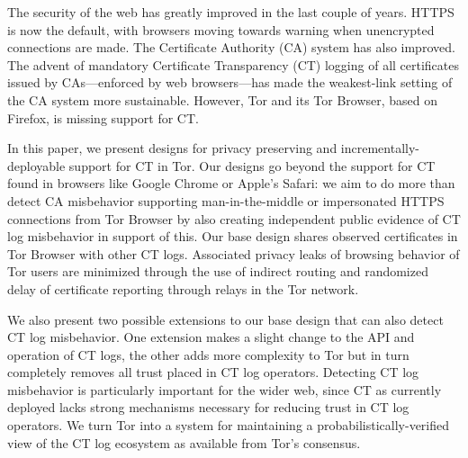 The security of the web has greatly improved in the last couple of years. HTTPS
is now the default, with browsers moving towards warning when unencrypted
connections are made. The Certificate Authority (CA) system has also improved.
The advent of mandatory Certificate Transparency (CT) logging of all
certificates issued by CAs---enforced by web browsers---has made the
weakest-link setting of the CA system more sustainable. However, Tor and its Tor
Browser, based on Firefox, is missing support for CT.

In this paper, we present designs for privacy preserving and
incrementally-deployable support for CT in Tor. Our designs go beyond
the support for CT found in browsers like Google Chrome or Apple's
Safari: we aim to do more than detect CA misbehavior supporting
man-in-the-middle or impersonated HTTPS connections from Tor Browser
by also creating independent public evidence of CT log misbehavior in
support of this. Our base design shares observed certificates in Tor
Browser with other CT logs. Associated privacy leaks of browsing
behavior of Tor users are minimized through the use of indirect
routing and randomized delay of certificate reporting through relays
in the Tor network.

We also present two possible extensions to our base design that can also detect
CT log misbehavior. One extension makes a slight change to the API and operation
of CT logs, the other adds more complexity to Tor but in turn completely removes
all trust placed in CT log operators. Detecting CT log misbehavior is
particularly important for the wider web, since CT as currently deployed lacks
strong mechanisms necessary for reducing trust in CT log operators.
We turn Tor into a system for maintaining a probabilistically-verified view of
the CT log ecosystem as available from Tor’s consensus.
